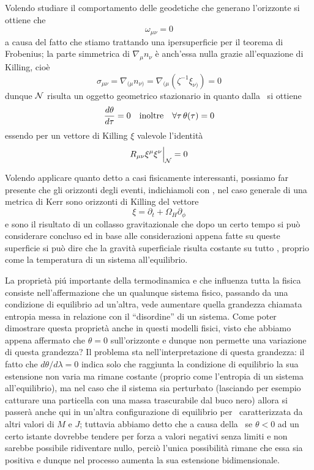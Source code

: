 Volendo studiare il comportamento delle geodetiche che generano l'orizzonte si ottiene che 
$$
\omega_{\mu\nu}=0
$$
a causa del fatto che stiamo trattando una ipersuperficie per il teorema di Frobenius; la parte simmetrica di $\nabla_\mu n_\nu$ \`e anch'essa nulla grazie all'equazione di Killing, cio\`e
$$
\sigma_{\mu\nu}=\nabla_{(\mu}n_{\nu)}=\nabla_{(\mu}(\zeta^{-1}\xi_{\nu)})=0
$$
dunque ${\cal N}$ risulta un oggetto geometrico stazionario in quanto dalla \Rayc\ si ottiene
$$
{d\theta\over d\tau}=0\quad\hbox{inoltre}\quad\forall\tau\,\theta(\tau)=0
$$
essendo per un vettore di Killing $\xi$ valevole l'identit\`a
$$
R_{\mu\nu}\xi^\mu\xi^\nu\Big|_{\cal N}=0
$$
\par
Volendo applicare quanto detto a casi fisicamente interessanti, possiamo far presente che gli orizzonti degli eventi, indichiamoli con \Oriz, nel caso generale di una metrica di Kerr sono orizzonti di Killing del vettore
$$
\xi=\partial_t+\Omega_H\partial_\phi
$$
e sono il risultato di un collasso gravitazionale che dopo un certo tempo si pu\`o considerare concluso ed in base alle considerazioni appena fatte su queste superficie si pu\`o dire che la gravit\`a superficiale risulta costante su tutto \Oriz, proprio come la temperatura di un sistema all'equilibrio.\par
La propriet\`a pi\'u importante della termodinamica e che influenza tutta la fisica consiste nell'affermazione che un qualunque sistema fisico, passando da una condizione di equilibrio ad un'altra, vede aumentare quella grandezza chiamata entropia messa in relazione con il ``disordine'' di un sistema. Come poter dimostrare questa propriet\`a anche in questi modelli fisici, visto che abbiamo appena affermato che $\theta=0$ sull'oriz\-zon\-te e dunque non permette una variazione di questa grandezza? Il problema sta nell'in\-ter\-pre\-ta\-zio\-ne di questa grandezza: il fatto che $d\theta/d\lambda =0$  indica solo che raggiunta la condizione di equilibrio la sua estensione non varia ma rimane costante (proprio come l'entropia di un sistema all'equilibrio), ma nel caso che il sistema sia perturbato (lasciando per esempio catturare una particella con una massa trascurabile dal buco nero) allora si passer\`a anche qui in un'altra configurazione di equilibrio per \Oriz\ caratterizzata da altri valori di $M$ e $J$; tuttavia abbiamo detto che a causa della \Focusing\ se $\theta<0$ ad un certo istante dovrebbe tendere per forza a valori negativi senza limiti e non sarebbe possibile ridiventare nullo, perci\`o l'unica possibilit\`a rimane che essa sia positiva e dunque nel processo aumenta la sua estensione bidimensionale.
